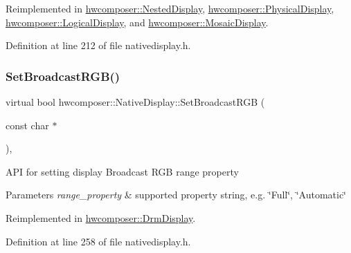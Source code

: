 Reimplemented in \mbox{\hyperlink{classhwcomposer_1_1NestedDisplay_ada28a82438946b62966b8e3fb4ad3e9d}{hwcomposer\+::\+Nested\+Display}}, \mbox{\hyperlink{classhwcomposer_1_1PhysicalDisplay_ae2d98d76852bced610ccff933486a741}{hwcomposer\+::\+Physical\+Display}}, \mbox{\hyperlink{classhwcomposer_1_1LogicalDisplay_a3244bd17dbe005b1e8db94fd646f246f}{hwcomposer\+::\+Logical\+Display}}, and \mbox{\hyperlink{classhwcomposer_1_1MosaicDisplay_a113c244569faf509d03062f794216981}{hwcomposer\+::\+Mosaic\+Display}}.



Definition at line 212 of file nativedisplay.\+h.


\begin{DoxyCode}{0}
\end{DoxyCode}
\mbox{\label{classhwcomposer_1_1NativeDisplay_ae7c13718b2b297caa04479a6782e38ea}} 
\subsubsection{\texorpdfstring{Set\+Broadcast\+R\+G\+B()}{SetBroadcastRGB()}}
{\footnotesize\ttfamily virtual bool hwcomposer\+::\+Native\+Display\+::\+Set\+Broadcast\+R\+GB (\begin{DoxyParamCaption}\item[{const char $\ast$}]{ }\end{DoxyParamCaption})\hspace{0.3cm}{\ttfamily [inline]}, {\ttfamily [virtual]}}

A\+PI for setting display Broadcast R\+GB range property 
\begin{DoxyParams}{Parameters}
{\em range\+\_\+property} & supported property string, e.\+g. \char`\"{}\+Full\char`\"{}, \char`\"{}\+Automatic\char`\"{} \\
\hline
\end{DoxyParams}


Reimplemented in \mbox{\hyperlink{classhwcomposer_1_1DrmDisplay_abf4285912666230bf6172dae5a867ba7}{hwcomposer\+::\+Drm\+Display}}.



Definition at line 258 of file nativedisplay.\+h.


